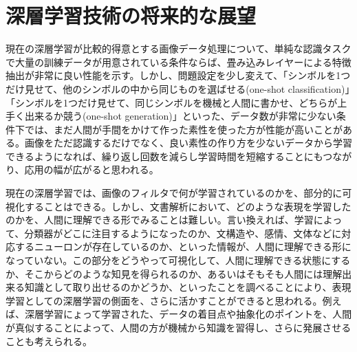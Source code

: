 \section{深層学習技術の将来的な展望}
現在の深層学習が比較的得意とする画像データ処理について、単純な認識タスクで大量の訓練データが用意されている条件ならば、畳み込みレイヤーによる特徴抽出が非常に良い性能を示す。しかし、問題設定を少し変えて、「シンボルを1つだけ見せて、他のシンボルの中から同じものを選ばせる(one-shot classification)」「シンボルを1つだけ見せて、同じシンボルを機械と人間に書かせ、どちらが上手く出来るか競う(one-shot generation)」といった、データ数が非常に少ない条件下では、まだ人間が手間をかけて作った素性を使った方が性能が高いことがある\cite{lake2013one-shot}。画像をただ認識するだけでなく、良い素性の作り方を少ないデータから学習できるようになれば、繰り返し回数を減らし学習時間を短縮することにもつながり、応用の幅が広がると思われる。\par
現在の深層学習では、画像のフィルタで何が学習されているのかを、部分的に可視化することはできる。しかし、文書解析において、どのような表現を学習したのかを、人間に理解できる形でみることは難しい。言い換えれば、学習によって、分類器がどこに注目するようになったのか、文構造や、感情、文体などに対応するニューロンが存在しているのか、といった情報が、人間に理解できる形になっていない。この部分をどうやって可視化して、人間に理解できる状態にするか、そこからどのような知見を得られるのか、あるいはそもそも人間には理解出来る知識として取り出せるのかどうか、といったことを調べることにより、表現学習としての深層学習の側面を、さらに活かすことができると思われる。例えば、深層学習にょって学習された、データの着目点や抽象化のポイントを、人間が真似することによって、人間の方が機械から知識を習得し、さらに発展させることも考えられる。
